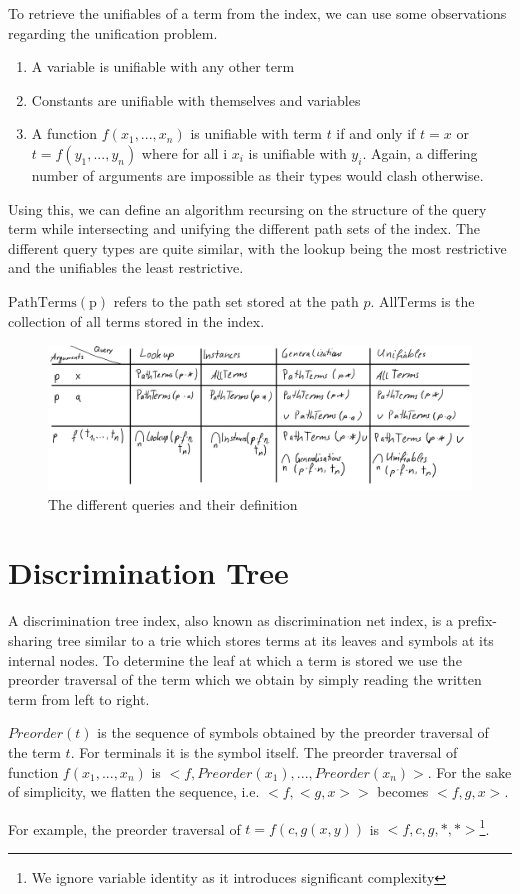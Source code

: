 To retrieve the unifiables of a term from the index, we can use some observations regarding the unification problem.
\begin{enumerate}
  \item A variable is unifiable with any other term
  \item Constants are unifiable with themselves and variables
  \item A function $f(x_{1},...,x_{n})$ is unifiable with term $t$ if and only if $t = x$ or $t = f(y_{1},...,y_{n})$ where for all i $x_{i}$ is unifiable with $y_{i}$. Again, a differing number of arguments are impossible as their types would clash otherwise.
\end{enumerate}
Using this, we can define an algorithm recursing on the structure of the query term while intersecting and unifying the different path sets of the index. The different query types are quite similar, with the lookup being the most restrictive and the unifiables the least restrictive.

$\mathrm{PathTerms(p)}$ refers to the path set stored at the path $p$. $\mathrm{AllTerms}$ is the collection of all terms stored in the index.
\begin{figure}[h]
\centering
\includegraphics[scale=0.25]{figures/queries.png}
\caption{The different queries and their definition}
\end{figure}

\section{Discrimination Tree}
A discrimination tree index, also known as discrimination net index, is a prefix-sharing tree similar to a trie which stores terms at its leaves and symbols at its internal nodes. To determine the leaf at which a term is stored we use the preorder traversal of the term which we obtain by simply reading the written term from left to right.

\begin{defn}
  $Preorder(t)$ is the sequence of symbols obtained by the preorder traversal of the term $t$. For terminals it is the symbol itself. The preorder traversal of function $f(x_{1},...,x_{n})$ is $<f,Preorder(x_{1}),...,Preorder(x_{n})>$. For the sake of simplicity, we flatten the sequence, i.e. $<f,<g,x>>$ becomes $<f,g,x>$.
\end{defn}
For example, the preorder traversal of $t = f(c,g(x,y))$ is $<f,c,g,*,*>$\footnote{We ignore variable identity as it introduces significant complexity}.

